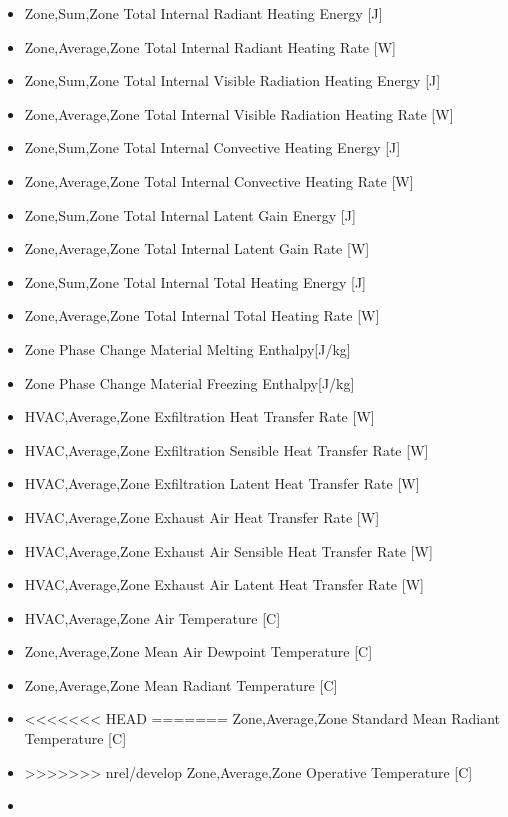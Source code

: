 \begin{itemize}
\item
  Zone,Sum,Zone Total Internal Radiant Heating Energy {[}J{]}
\item
  Zone,Average,Zone Total Internal Radiant Heating Rate {[}W{]}
\item
  Zone,Sum,Zone Total Internal Visible Radiation Heating Energy {[}J{]}
\item
  Zone,Average,Zone Total Internal Visible Radiation Heating Rate {[}W{]}
\item
  Zone,Sum,Zone Total Internal Convective Heating Energy {[}J{]}
\item
  Zone,Average,Zone Total Internal Convective Heating Rate {[}W{]}
\item
  Zone,Sum,Zone Total Internal Latent Gain Energy {[}J{]}
\item
  Zone,Average,Zone Total Internal Latent Gain Rate {[}W{]}
\item
  Zone,Sum,Zone Total Internal Total Heating Energy {[}J{]}
\item
  Zone,Average,Zone Total Internal Total Heating Rate {[}W{]}
 \item
  Zone Phase Change Material Melting Enthalpy{[{J/kg}]}
 \item
  Zone Phase Change Material Freezing Enthalpy{[{J/kg}]}
\item
  HVAC,Average,Zone Exfiltration Heat Transfer Rate {[}W{]}
\item
  HVAC,Average,Zone Exfiltration Sensible Heat Transfer Rate {[}W{]}
\item
  HVAC,Average,Zone Exfiltration Latent Heat Transfer Rate {[}W{]}
\item
  HVAC,Average,Zone Exhaust Air Heat Transfer Rate {[}W{]}
\item
  HVAC,Average,Zone Exhaust Air Sensible Heat Transfer Rate {[}W{]}
\item
  HVAC,Average,Zone Exhaust Air Latent Heat Transfer Rate {[}W{]}
\item
  HVAC,Average,Zone Air Temperature {[}C{]}
\item
  Zone,Average,Zone Mean Air Dewpoint Temperature {[}C{]}
\item
  Zone,Average,Zone Mean Radiant Temperature {[}C{]}
\item
<<<<<<< HEAD
=======
  Zone,Average,Zone Standard Mean Radiant Temperature {[}C{]}
\item
>>>>>>> nrel/develop
  Zone,Average,Zone Operative Temperature {[}C{]}
\item

\end{itemize}
